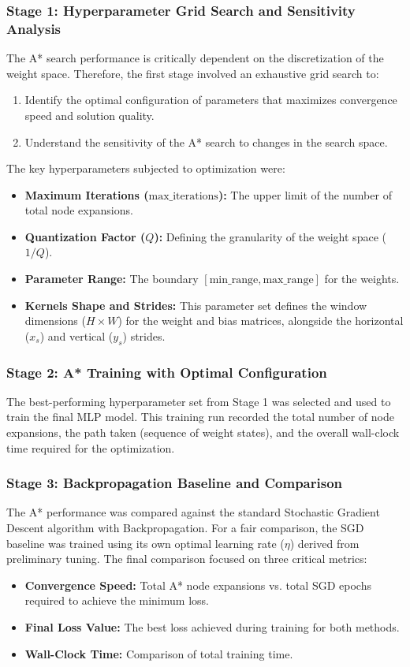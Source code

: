 \subsubsection{Stage 1: Hyperparameter Grid Search and Sensitivity Analysis}
The A* search performance is critically dependent on the discretization of the weight space. Therefore, the first stage involved an exhaustive grid search to:
\begin{enumerate}
    \item Identify the optimal configuration of parameters that maximizes convergence speed and solution quality.
    \item Understand the sensitivity of the A* search to changes in the search space.
\end{enumerate}
The key hyperparameters subjected to optimization were:
\begin{itemize}
    \item \textbf{Maximum Iterations ($\text{max\_iterations}$):} The upper limit of the number of total node expansions.
    \item \textbf{Quantization Factor ($Q$):} Defining the granularity of the weight space ($1/Q$).
    \item \textbf{Parameter Range:} The boundary $[\text{min\_range}, \text{max\_range}]$ for the weights.
    \item \textbf{Kernels Shape and Strides:} This parameter set defines the window dimensions ($H \times W$) for the weight and bias matrices, alongside the horizontal ($x_s$) and vertical ($y_s$) strides.
\end{itemize}
\subsubsection{Stage 2: A* Training with Optimal Configuration}
The best-performing hyperparameter set from Stage 1 was selected and used to train the final MLP model. This training run recorded the total number of node expansions, the path taken (sequence of weight states), and the overall wall-clock time required for the optimization.

\subsubsection{Stage 3: Backpropagation Baseline and Comparison}
The A* performance was compared against the standard Stochastic Gradient Descent algorithm with Backpropagation. For a fair comparison, the SGD baseline was trained using its own optimal learning rate ($\eta$) derived from preliminary tuning. The final comparison focused on three critical metrics:
\begin{itemize}
    \item \textbf{Convergence Speed:} Total A* node expansions vs. total SGD epochs required to achieve the minimum loss.
    \item \textbf{Final Loss Value:} The best loss achieved during training for both methods.
    \item \textbf{Wall-Clock Time:} Comparison of total training time.
\end{itemize}

